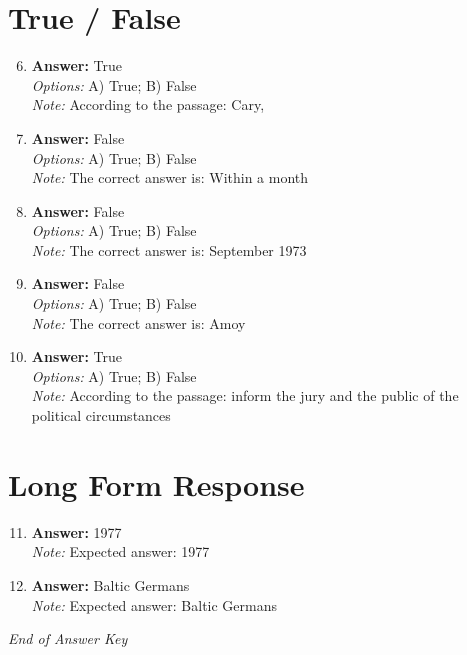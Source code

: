 \documentclass[12pt]{article}
\begin{document}
\section*{True / False}
\begin{enumerate}[label=\arabic*.]
\setcounter{enumi}{5}
\item \textbf{Answer:} True
\\ \textit{Options:} A) True; B) False
\\ \textit{Note:} According to the passage: Cary,
\item \textbf{Answer:} False
\\ \textit{Options:} A) True; B) False
\\ \textit{Note:} The correct answer is: Within a month
\item \textbf{Answer:} False
\\ \textit{Options:} A) True; B) False
\\ \textit{Note:} The correct answer is: September 1973
\item \textbf{Answer:} False
\\ \textit{Options:} A) True; B) False
\\ \textit{Note:} The correct answer is: Amoy
\item \textbf{Answer:} True
\\ \textit{Options:} A) True; B) False
\\ \textit{Note:} According to the passage: inform the jury and the public of the political circumstances
\end{enumerate}

\section*{Long Form Response}
\begin{enumerate}[label=\arabic*.]
\setcounter{enumi}{10}
\item \textbf{Answer:} 1977
\\ \textit{Note:} Expected answer: 1977
\item \textbf{Answer:} Baltic Germans
\\ \textit{Note:} Expected answer: Baltic Germans
\end{enumerate}

\vfill
\noindent\textit{End of Answer Key}
\end{document}
